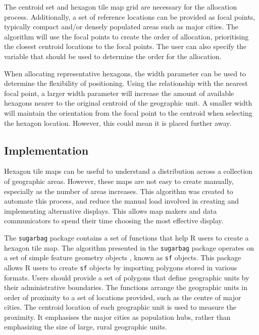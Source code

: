 The centroid set and hexagon tile map grid are necessary for the
allocation process. Additionally, a set of reference locations can be
provided as focal points, typically compact and/or densely populated
areas such as major cities. The algorithm will use the focal points to
create the order of allocation, prioritising the closest centroid
locations to the focal points. The user can also specify the variable
that should be used to determine the order for the allocation.

When allocating representative hexagons, the width parameter can be used
to determine the flexibility of positioning. Using the relationship with
the nearest focal point, a larger width parameter will increase the
amount of available hexagons nearer to the original centroid of the
geographic unit. A smaller width will maintain the orientation from the
focal point to the centroid when selecting the hexagon location.
However, this could mean it is placed further away.

\hypertarget{implementation}{%
\subsection{Implementation}\label{implementation}}

Hexagon tile maps can be useful to understand a distribution across a
collection of geographic areas. However, these maps are not easy to
create manually, especially as the number of areas increases. This
algorithm was created to automate this process, and reduce the manual
load involved in creating and implementing alternative displays. This
allows map makers and data communicators to spend their time choosing
the most effective display.

The \texttt{sugarbag} package contains a set of functions that help R
users to create a hexagon tile map. The algorithm presented in the
\texttt{sugarbag} package operates on a set of simple feature geometry
objects , known as \texttt{sf} objects\citep{sf}. This package allows R
users to create \texttt{sf} objects by importing polygons stored in
various formats. Users should provide a set of polygons that define
geographic units by their administrative boundaries. The functions
arrange the geographic units in order of proximity to a set of locations
provided, such as the centre of major cities. The centroid location of
each geographic unit is used to measure the proximity. It emphasises the
major cities as population hubs, rather than emphasizing the size of
large, rural geographic units.


